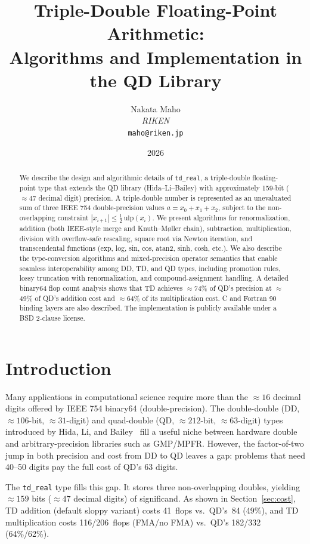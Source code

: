 \documentclass[11pt,a4paper]{article}
\title{%
  Triple-Double Floating-Point Arithmetic: \\
  Algorithms and Implementation in the QD Library%
}
\author{%
  Nakata Maho \\
  \textit{RIKEN} \\
  \texttt{maho@riken.jp}%
}
\date{2026}
\begin{document}
\maketitle

\begin{abstract}
We describe the design and algorithmic details of \texttt{td\_real}, a
triple-double floating-point type that extends the QD library
(Hida--Li--Bailey) with approximately 159-bit ($\approx 47$ decimal
digit) precision.  A triple-double number is represented as an
unevaluated sum of three IEEE 754 double-precision values
$a = x_0 + x_1 + x_2$, subject to the non-overlapping constraint
$|x_{i+1}| \le \tfrac{1}{2}\,\mathrm{ulp}(x_i)$.  We present
algorithms for renormalization, addition (both IEEE-style merge and
Knuth--M{\o}ller chain), subtraction, multiplication, division with
overflow-safe rescaling, square root via Newton iteration, and
transcendental functions (exp, log, sin, cos, atan2, sinh, cosh,
etc.).  We also describe the type-conversion algorithms and
mixed-precision operator semantics that enable seamless
interoperability among DD, TD, and QD types, including promotion
rules, lossy truncation with renormalization, and compound-assignment
handling.  A detailed binary64 flop count analysis shows that TD
achieves $\approx$74\% of QD's precision at $\approx$49\% of
QD's addition cost and $\approx$64\% of its multiplication cost.
C and Fortran 90 binding layers are also described.  The
implementation is publicly available under a BSD 2-clause license.
\end{abstract}

\section{Introduction}

Many applications in computational science require more than the
$\approx 16$ decimal digits offered by IEEE 754 binary64
(double-precision).  The double-double (DD, $\approx 106$-bit,
$\approx 31$-digit) and quad-double (QD, $\approx 212$-bit,
$\approx 63$-digit) types introduced by Hida, Li, and
Bailey~\cite{HLB2001,QDlib} fill a useful niche between hardware
double and arbitrary-precision libraries such as GMP/MPFR.  However,
the factor-of-two jump in both precision and cost from DD to QD
leaves a gap: problems that need 40--50 digits pay the full cost of
QD's 63 digits.

The \texttt{td\_real} type fills this gap.  It stores three
non-overlapping doubles, yielding $\approx 159$ bits ($\approx 47$
decimal digits) of significand.  As shown in Section~\ref{sec:cost},
TD addition (default sloppy variant) costs 41~flops vs.\ QD's~84
(49\%), and TD multiplication costs 116/206~flops (FMA/no FMA)
vs.\ QD's 182/332 (64\%/62\%).
\end{document}
